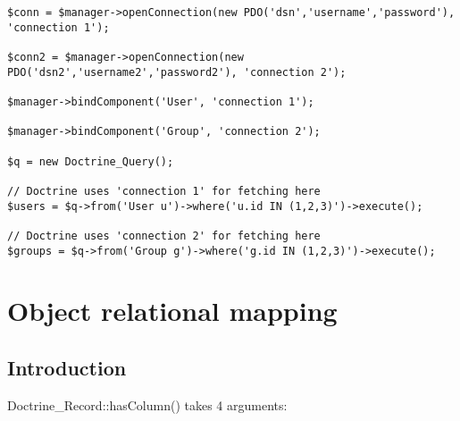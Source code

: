 \documentclass[11pt,a4paper]{report}
\begin{document}
\begin{verbatim}
$conn = $manager->openConnection(new PDO('dsn','username','password'), 'connection 1');

$conn2 = $manager->openConnection(new PDO('dsn2','username2','password2'), 'connection 2');

$manager->bindComponent('User', 'connection 1');

$manager->bindComponent('Group', 'connection 2');

$q = new Doctrine_Query();

// Doctrine uses 'connection 1' for fetching here
$users = $q->from('User u')->where('u.id IN (1,2,3)')->execute();

// Doctrine uses 'connection 2' for fetching here
$groups = $q->from('Group g')->where('g.id IN (1,2,3)')->execute();
\end{verbatim}

\chapter{Object relational mapping}
\section{Introduction}
Doctrine\_Record::hasColumn() takes 4 arguments:
\end{document}
